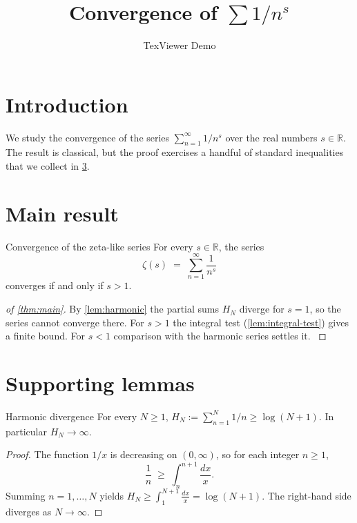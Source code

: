 \documentclass{article}
\title{Convergence of $\sum 1/n^s$}
\author{TexViewer Demo}
\newcommand{\R}{\mathbb{R}}
\begin{document}
\maketitle

\section{Introduction}
\label{sec:intro}
We study the convergence of the series $\sum_{n=1}^{\infty} 1/n^s$ over the
real numbers $s \in \R$. The result is classical, but the proof exercises a
handful of standard inequalities that we collect in \cref{sec:lemmas}.

\section{Main result}
\label{sec:main}

\begin{theorem}[role=main]{Convergence of the zeta-like series}
\label{thm:main}
For every $s \in \R$, the series
\[
  \zeta(s) \;=\; \sum_{n=1}^{\infty} \frac{1}{n^s}
\]
converges if and only if $s > 1$.
\end{theorem}

\begin{proof}[of \cref{thm:main}]
By \cref{lem:harmonic} the partial sums $H_N$ diverge for $s = 1$, so the
series cannot converge there. For $s > 1$ the integral test
(\cref{lem:integral-test}) gives a finite bound. For $s < 1$ comparison with
the harmonic series settles it. \cite{Rudin1976}
\end{proof}

\section{Supporting lemmas}
\label{sec:lemmas}

\begin{lemma}[role=supporting]{Harmonic divergence}
\label{lem:harmonic}
For every $N \ge 1$, $H_N := \sum_{n=1}^{N} 1/n \ge \log(N+1)$. In
particular $H_N \to \infty$.
\end{lemma}

\begin{proof}
The function $1/x$ is decreasing on $(0,\infty)$, so for each integer
$n \ge 1$,
\[
  \frac{1}{n} \;\ge\; \int_{n}^{n+1} \frac{dx}{x}.
\]
Summing $n = 1, \dots, N$ yields $H_N \ge \int_1^{N+1} \frac{dx}{x} = \log(N+1)$. The
right-hand side diverges as $N \to \infty$.
\end{proof}
\end{document}
